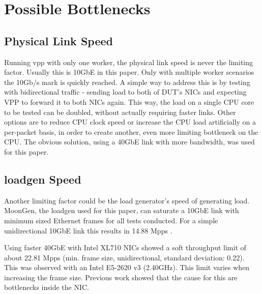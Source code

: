 \section{Possible Bottlenecks}

\subsection{Physical Link Speed}
\label{sec:linkspeed}


Running \Ac{vpp} with only one worker, the physical link speed is never
the limiting factor. Usually this is 10GbE in this paper. Only with
multiple worker scenarios the 10Gb/s mark is quickly reached. A simple
way to address this is by testing with bidirectional traffic - sending
load to both of DUT's NICs and expecting VPP to forward it to both
NICs again. This way, the load on a single CPU core to be tested can
be doubled, without actually requiring faster links. Other options are
to reduce CPU clock speed or increase the CPU load artificially on a
per-packet basis, in order to create another, even more limiting
bottleneck on the CPU. The obvious solution, using a 40GbE link with
more bandwidth, was used for this paper.


\subsection{\Ac{loadgen} Speed}


Another limiting factor could be the load generator's speed of
generating load. MoonGen, the \Ac{loadgen} used for this paper, can
saturate a 10GbE link with minimum sized Ethernet frames for all tests
conducted. For a simple unidirectional 10GbE link this results in
14.88 Mpps \cite{emmerich2015assessing}.


\label{sec:40gbelimit}

Using faster 40GbE with Intel XL710 NICs showed a soft throughput
limit of about 22.81 Mpps (min. frame size, unidirectional, standard
deviation: 0.22). This was observed with an Intel E5-2620 v3
(2.40GHz). This limit varies when increasing the frame size. Previous
work showed that the cause for this are bottlenecks inside the NIC.
\cite{emmerich2015moongen}

